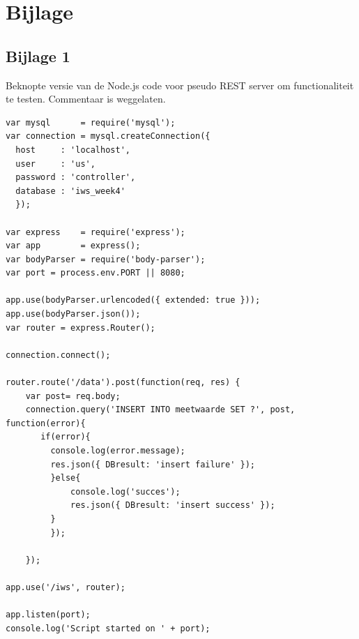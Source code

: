 \documentclass[12pt]{article}
\begin{document}
\section{Bijlage}
\subsection*{Bijlage 1}
Beknopte versie van de Node.js code voor pseudo REST server om functionaliteit te testen. Commentaar is weggelaten.
\begin{lstlisting}
var mysql      = require('mysql');
var connection = mysql.createConnection({
  host     : 'localhost',
  user     : 'us',
  password : 'controller',
  database : 'iws_week4'
  });

var express    = require('express');
var app        = express();  
var bodyParser = require('body-parser');
var port = process.env.PORT || 8080;

app.use(bodyParser.urlencoded({ extended: true }));
app.use(bodyParser.json()); 
var router = express.Router(); 

connection.connect();

router.route('/data').post(function(req, res) {
    var post= req.body;
    connection.query('INSERT INTO meetwaarde SET ?', post, function(error){
       if(error){
         console.log(error.message);
         res.json({ DBresult: 'insert failure' });
         }else{
             console.log('succes');
             res.json({ DBresult: 'insert success' });
         }
         });
    
    });

app.use('/iws', router);

app.listen(port);
console.log('Script started on ' + port);
\end{lstlisting}
\end{document}

